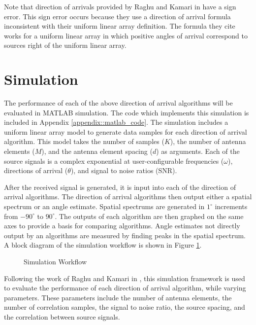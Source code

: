 \documentclass[conference]{IEEEtran}
\begin{document}
		Note that direction of arrivals provided by Raghu and Kamari in \cite{doa_algorithms_raghu} have a sign error. This sign error occurs because they use a direction of arrival formula inconsistent with their uniform linear array definition. The formula they cite works for a uniform linear array in which positive angles of arrival correspond to sources right of the uniform linear array.
		
	\section{Simulation}
	
		The performance of each of the above direction of arrival algorithms will be evaluated in MATLAB simulation. The code which implements this simulation is included in Appendix \ref{appendix::matlab_code}. The simulation includes a uniform linear array model to generate data samples for each direction of arrival algorithm. This model takes the number of samples ($K$), the number of antenna elements ($M$), and the antenna element spacing ($d$) as arguments. Each of the source signals is a complex exponential at user-configurable frequencies ($\omega$), directions of arrival ($\theta$), and signal to noise ratios (SNR).
		
		After the received signal is generated, it is input into each of the direction of arrival algorithms. The direction of arrival algorithms then output either a spatial spectrum or an angle estimate. Spatial spectrums are generated in $1^{\circ}$ increments from $-90^{\circ}$ to $90^{\circ}$. The outputs of each algorithm are then graphed on the same axes to provide a basis for comparing algorithms. Angle estimates not directly output by an algorithms are measured by finding peaks in the spatial spectrum. A block diagram of the simulation workflow is shown in Figure \ref{fig::sim_workflow}.
		
		\begin{figure}[H]
			\centerline{}
			\caption{Simulation Workflow}
			\label{fig::sim_workflow}
		\end{figure}
		
		Following the work of Raghu and Kamari in \cite{doa_algorithms_raghu}, this simulation framework is used to evaluate the performance of each direction of arrival algorithm, while varying parameters. These parameters include the number of antenna elements, the number of correlation samples, the signal to noise ratio, the source spacing, and the correlation between source signals.
		
\end{document}
